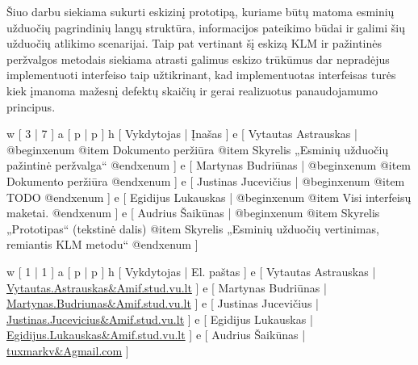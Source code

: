 
Šiuo darbu siekiama sukurti eskizinį prototipą, kuriame būtų matoma esminių
užduočių pagrindinių langų struktūra, informacijos pateikimo būdai ir galimi
šių užduočių atlikimo scenarijai. Taip pat vertinant šį eskizą KLM ir pažintinės
peržvalgos metodais siekiama atrasti galimus eskizo trūkūmus dar nepradėjus
implementuoti interfeiso taip užtikrinant, kad implementuotas interfeisas
turės kiek įmanoma mažesnį defektų skaičių ir gerai realizuotus panaudojamumo
principus.

\xtable
{
  w [ 3  | 7 ]
  a [ p  | p ]
  h [ Vykdytojas | Įnašas ]
  e [ Vytautas Astrauskas
  | @begin{xenum} 
      @item Dokumento peržiūra
      @item Skyrelis „Esminių užduočių pažintinė peržvalga“
    @end{xenum}
  ]
  e [ Martynas Budriūnas
  | @begin{xenum} 
      @item Dokumento peržiūra
    @end{xenum}
  ]
  e [ Justinas Jucevičius 
  | @begin{xenum} 
      @item TODO
    @end{xenum}
  ]
  e [ Egidijus Lukauskas 
  | @begin{xenum} 
      @item Visi interfeisų maketai.
    @end{xenum}
  ]
  e [ Audrius Šaikūnas 
  | @begin{xenum} 
      @item Skyrelis „Prototipas“ (tekstinė dalis)
      @item Skyrelis „Esminių užduočių vertinimas, remiantis KLM metodu“
    @end{xenum}
  ]
}

\xtableu
{
  w [ 1 | 1 ]
  a [ p | p ]
  h [ Vykdytojas | El. paštas ]
  e [ Vytautas Astrauskas | \url{Vytautas.Astrauskas&Amif.stud.vu.lt} ]
  e [ Martynas Budriūnas  | \url{Martynas.Budriunas&Amif.stud.vu.lt} ]
  e [ Justinas Jucevičius | \url{Justinas.Jucevicius&Amif.stud.vu.lt} ]
  e [ Egidijus Lukauskas  | \url{Egidijus.Lukauskas&Amif.stud.vu.lt} ]
  e [ Audrius Šaikūnas    | \url{tuxmarkv&Agmail.com} ]
}
